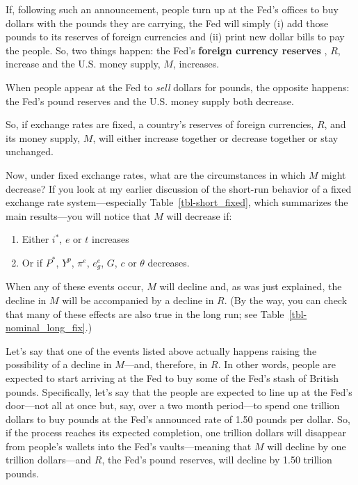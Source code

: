 \documentclass[
  letterpaper,
]{book}
\providecommand{\tightlist}{%
  \setlength{\itemsep}{0pt}\setlength{\parskip}{0pt}}\usepackage{longtable,booktabs,array}
\theoremstyle{plain}
\theoremstyle{remark}
\begin{document}
If, following such an announcement, people turn up at the Fed's offices
to buy dollars with the pounds they are carrying, the Fed will simply
(i) add those pounds to its reserves of foreign currencies and (ii)
print new dollar bills to pay the people. So, two things happen: the
Fed's \textbf{foreign currency reserves}
, \(R\), increase and the U.S. money
supply, \(M\), increases.

When people appear at the Fed to \emph{sell} dollars for pounds, the
opposite happens: the Fed's pound reserves and the U.S. money supply
both decrease.

So, if exchange rates are fixed, a country's reserves of foreign
currencies, \(R\), and its money supply, \(M\), will either increase
together or decrease together or stay unchanged.

Now, under fixed exchange rates, what are the circumstances in which
\(M\) might decrease? If you look at my earlier discussion of the
short-run behavior of a fixed exchange rate system---especially
Table~\ref{tbl-short_fixed}, which summarizes the main results---you
will notice that \(M\) will decrease if:

\begin{enumerate}
\def\labelenumi{\arabic{enumi}.}
\tightlist
\item
  Either \(i^*\), \(e\) or \(t\) increases
\item
  Or if \(P^*\), \(Y^p\), \(\pi^e\), \(e_g^e\), \(G\), \(c\) or
  \(\theta\) decreases.
\end{enumerate}

When any of these events occur, \(M\) will decline and, as was just
explained, the decline in \(M\) will be accompanied by a decline in
\(R\). (By the way, you can check that many of these effects are also
true in the long run; see Table~\ref{tbl-nominal_long_fix}.)

Let's say that one of the events listed above actually happens raising
the possibility of a decline in \(M\)---and, therefore, in \(R\). In
other words, people are expected to start arriving at the Fed to buy
some of the Fed's stash of British pounds. Specifically, let's say that
the people are expected to line up at the Fed's door---not all at once
but, say, over a two month period---to spend one trillion dollars to buy
pounds at the Fed's announced rate of 1.50 pounds per dollar. So, if the
process reaches its expected completion, one trillion dollars will
disappear from people's wallets into the Fed's vaults---meaning that
\(M\) will decline by one trillion dollars---and \(R\), the Fed's pound
reserves, will decline by 1.50 trillion pounds.
\end{document}

